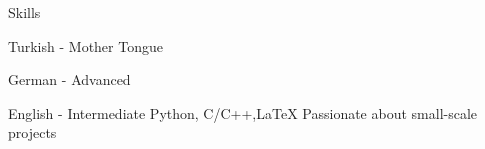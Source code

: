 
\begin{rubric}{Skills}
\entry*[Languages]


Turkish - Mother Tongue

	German - Advanced

    English - Intermediate
    Python, C/C++,LaTeX
	Passionate about small-scale projects
\end{rubric}
